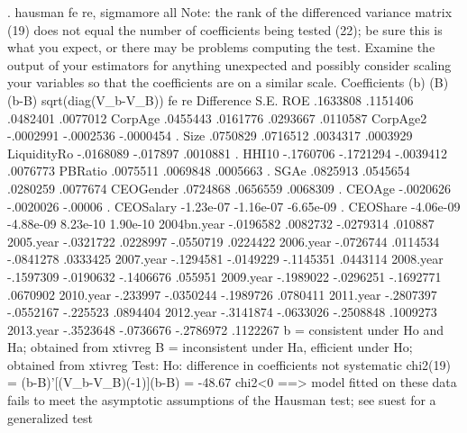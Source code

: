 . hausman fe re, sigmamore all
{\smallskip}
Note: the rank of the differenced variance matrix (19) does not equal the
        number of coefficients being tested (22); be sure this is what you
        expect, or there may be problems computing the test.  Examine the
        output of your estimators for anything unexpected and possibly consider
        scaling your variables so that the coefficients are on a similar scale.
{\smallskip}
                  Coefficients 
             {\VBAR}      (b)          (B)            (b-B)     sqrt(diag(V_b-V_B))
             {\VBAR}       fe           re         Difference          S.E.
         ROE {\VBAR}    .1633808     .1151406        .0482401        .0077012
     CorpAge {\VBAR}    .0455443     .0161776        .0293667        .0110587
    CorpAge2 {\VBAR}   -.0002991    -.0002536       -.0000454               .
        Size {\VBAR}    .0750829     .0716512        .0034317        .0003929
LiquidityR{\tytilde}o {\VBAR}   -.0168089     -.017897        .0010881               .
       HHI10 {\VBAR}   -.1760706    -.1721294       -.0039412        .0076773
     PBRatio {\VBAR}    .0075511     .0069848        .0005663               .
        SGAe {\VBAR}    .0825913     .0545654        .0280259        .0077674
   CEOGender {\VBAR}    .0724868     .0656559        .0068309               .
      CEOAge {\VBAR}   -.0020626    -.0020026         -.00006               .
   CEOSalary {\VBAR}   -1.23e-07    -1.16e-07       -6.65e-09               .
    CEOShare {\VBAR}   -4.06e-09    -4.88e-09        8.23e-10        1.90e-10
 2004bn.year {\VBAR}   -.0196582     .0082732       -.0279314         .010887
   2005.year {\VBAR}   -.0321722     .0228997       -.0550719        .0224422
   2006.year {\VBAR}   -.0726744     .0114534       -.0841278        .0333425
   2007.year {\VBAR}   -.1294581    -.0149229       -.1145351        .0443114
   2008.year {\VBAR}   -.1597309    -.0190632       -.1406676         .055951
   2009.year {\VBAR}   -.1989022    -.0296251       -.1692771        .0670902
   2010.year {\VBAR}    -.233997    -.0350244       -.1989726        .0780411
   2011.year {\VBAR}   -.2807397    -.0552167        -.225523        .0894404
   2012.year {\VBAR}   -.3141874    -.0633026       -.2508848        .1009273
   2013.year {\VBAR}   -.3523648    -.0736676       -.2786972        .1122267
                         b = consistent under Ho and Ha; obtained from xtivreg
          B = inconsistent under Ha, efficient under Ho; obtained from xtivreg
{\smallskip}
    Test:  Ho:  difference in coefficients not systematic
{\smallskip}
                 chi2(19) = (b-B)'[(V_b-V_B){\caret}(-1)](b-B)
                          =   -48.67    chi2<0 ==> model fitted on these
                                        data fails to meet the asymptotic
                                        assumptions of the Hausman test;
                                        see suest for a generalized test
